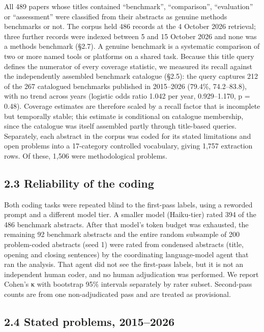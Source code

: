 \documentclass[11pt]{article}
\begin{document}
All 489 papers whose titles contained ``benchmark'', ``comparison'',
``evaluation'' or ``assessment'' were classified from their abstracts as
genuine methods benchmarks or not. The corpus held 486 records at the 4
October 2026 retrieval; three further records were indexed between 5 and
15 October 2026 and none was a methods benchmark (§2.7). A genuine
benchmark is a systematic comparison of two or more named tools or
platforms on a shared task. Because this title query defines the
numerator of every coverage statistic, we measured its recall against
the independently assembled benchmark catalogue (§2.5): the query
captures 212 of the 267 catalogued benchmarks published in 2015--2026
(79.4\%, 74.2--83.8), with no trend across years (logistic odds ratio
1.042 per year, 0.929--1.170, p = 0.48). Coverage estimates are
therefore scaled by a recall factor that is incomplete but temporally
stable; this estimate is conditional on catalogue membership, since the
catalogue was itself assembled partly through title-based queries.
Separately, each abstract in the corpus was coded for its stated
limitations and open problems into a 17-category controlled vocabulary,
giving 1,757 extraction rows. Of these, 1,506 were methodological
problems.

\subsection{2.3 Reliability of the coding}\label{reliability-of-the-coding}

Both coding tasks were repeated blind to the first-pass labels, using a
reworded prompt and a different model tier. A smaller model (Haiku-tier)
rated 394 of the 486 benchmark abstracts. After that model's token
budget was exhausted, the remaining 92 benchmark abstracts and the
entire random subsample of 200 problem-coded abstracts (seed 1) were
rated from condensed abstracts (title, opening and closing sentences) by
the coordinating language-model agent that ran the analysis. That agent
did not see the first-pass labels, but it is not an independent human
coder, and no human adjudication was performed. We report Cohen's κ with
bootstrap 95\% intervals separately by rater subset. Second-pass counts
are from one non-adjudicated pass and are treated as provisional.

\subsection{2.4 Stated problems, 2015--2026}\label{stated-problems-20152026}
\end{document}

